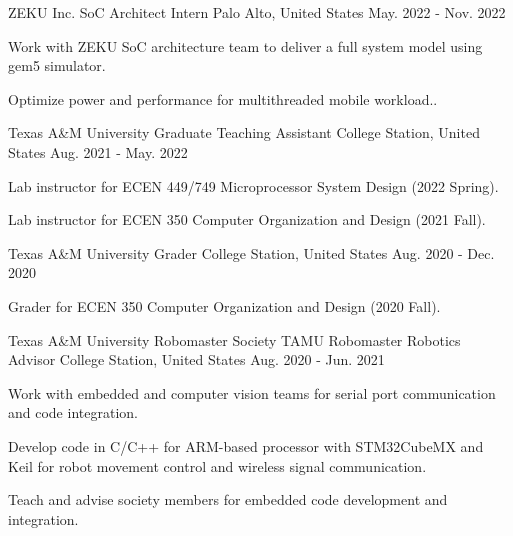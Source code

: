 
\begin{cventries}
    \cventry
    {ZEKU Inc.} %
    {SoC Architect Intern} %
    {Palo Alto, United States} %
    {May. 2022 - Nov. 2022} %
    {
      \begin{cvitems} %
        \item {Work with ZEKU SoC architecture team to deliver a full system model using gem5 simulator.}
        \item {Optimize power and performance for multithreaded mobile workload..}
      \end{cvitems}
    }
    
    \cventry
    {Texas A\&M University} %
    {Graduate Teaching Assistant} %
    {College Station, United States} %
    {Aug. 2021 - May. 2022} %
    {
      \begin{cvitems} %
        \item {Lab instructor for ECEN 449/749 Microprocessor System Design (2022 Spring).}
        \item {Lab instructor for ECEN 350 Computer Organization and Design (2021 Fall).}
      \end{cvitems}
    }
    
  \cventry
    {Texas A\&M University} %
    {Grader} %
    {College Station, United States} %
    {Aug. 2020 - Dec. 2020} %
    {
      \begin{cvitems} %
        \item {Grader for ECEN 350 Computer Organization and Design (2020 Fall).}
      \end{cvitems}
    }
    
  \cventry
    {Texas A\&M University Robomaster Society} %
    {TAMU Robomaster Robotics Advisor} %
    {College Station, United States} %
    {Aug. 2020 - Jun. 2021} %
    {
      \begin{cvitems} %
        \item {Work with embedded and computer vision teams for serial port communication and code integration.}
        \item {Develop code in C/C++ for ARM-based processor with STM32CubeMX and Keil for robot movement control and wireless signal communication.}
        \item {Teach and advise society members for embedded code development and integration.}
      \end{cvitems}
    }


\end{cventries}
